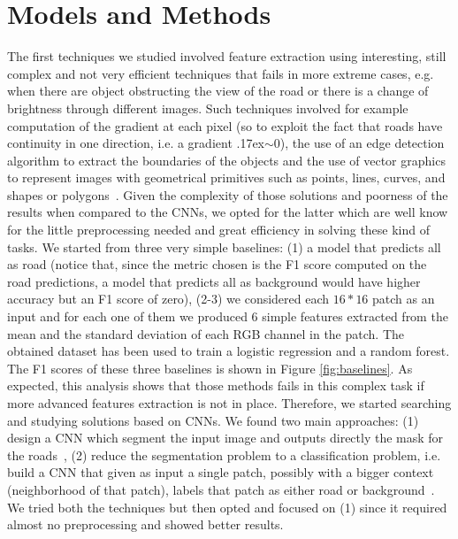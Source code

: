 \documentclass[10pt,conference,compsocconf]{IEEEtran}
\begin{document}
\section{Models and Methods}
\label{sec:models-methods}
The first techniques we studied involved feature extraction using interesting, still complex and not very efficient techniques that fails in more extreme cases, e.g. when there are object obstructing the view of the road or there is a change of brightness through different images. Such techniques involved for example computation of the gradient at each pixel (so to exploit the fact that roads have continuity in one direction, i.e. a gradient {\raise.17ex\hbox{$\scriptstyle\sim$}}0), the use of an edge detection algorithm to extract the boundaries of the objects and the use of vector graphics to represent images with geometrical primitives such as points, lines, curves, and shapes or polygons~\cite{HORMESE20161460}. Given the complexity of those solutions and poorness of the results when compared to the CNNs, we opted for the latter which are well know for the little preprocessing needed and great efficiency in solving these kind of tasks.
We started from three very simple baselines: (1) a model that predicts all as road (notice that, since the metric chosen is the F1 score computed on the road predictions, a model that predicts all as background would have higher accuracy but an F1 score of zero), (2-3) we considered each $16*16$ patch as an input and for each one of them we produced 6 simple features extracted from the mean and the standard deviation of each RGB channel in the patch. The obtained dataset has been used to train a logistic regression and a random forest. The F1 scores of these three baselines is shown in Figure \ref{fig:baselines}. As expected, this analysis shows that those methods fails in this complex task if more advanced features extraction is not in place.
Therefore, we started searching and studying solutions based on CNNs. We found two main approaches: (1) design a CNN which segment the input image and outputs directly the mask for the roads~\cite{lis2016}, (2) reduce the segmentation problem to a classification problem, i.e. build a CNN that given as input a single patch, possibly with a bigger context (neighborhood of that patch), labels that patch as either road or background~\cite{dario2016}. We tried both the techniques but then opted and focused on (1) since it required almost no preprocessing and showed better results.
\end{document}
